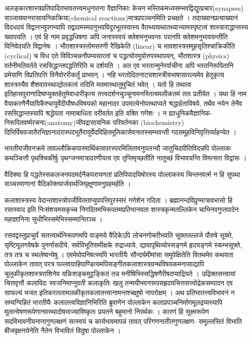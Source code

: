 {\dev अलङ्कारशास्त्रप्रतिपादितभावतत्त्वमधुनातना वैज्ञानिकाः केचन मस्तिकमध्यसम्भवद्विद्यु\break\-त्प्रचार}(synapses) {\dev सञ्जायमानरासायनिकक्रिया}(chemical reactions){\dev मात्रप्रपञ्चनमिति प्रचक्षते । तदाख्यानप्रत्याख्यानं विदधदयं विद्वानभ्युपगम्यापि तद्वादमस्मदनुभवविदूरभूत\break\-स्यास्य वैतथ्ययाथातथ्याभ्यामस्पृष्टत्वं शास्त्राराद्धा\-न्तस्य ख्यापयति । एवं हि नाम प्रवृद्धधिषणा अपि जनास्स्वयं क्लेशमनुभवन्तः परानपि क्लेशमनुभावयन्तीति विनिवेदयति विद्वानेषः । भौत\-शास्त्रस्तोमसरणी रैखिकेति} (linear) {\dev च भावशास्त्र\-समूहसृतिश्चाक्रिकीति} (cyclical) {\dev च विध एते विविञ्चन्ननौपम्यसारतां च पद्धत्योरमुयोरुपस्थापयन्, भौतशास्त्र} (physics) {\dev वर्तनीमति\-वर्तते रससिद्धान्तपद्धतिरिति च दर्शयति । अत एव भरतान्मुनेरर्वाचीना अपि भरतनिरूपितानि प्रमेयाणि विप्रतिपत्तिं विनैवोररीकर्तुं प्राभवन् । नहि भरतोदितनाट्य\-शास्त्रीयभाषासारल्यमेव हेतूकृत्य शास्त्रस्यैव शैशवावस्थाद्योतकत्वं तदिति मतमास्थातुमुचितं भवेत् । यतो हि तथात्व इतिहासपुराणादिष्वप्युक्तहेतुमेवाधारीकृत्य तत्त्वदर्शनचुञ्चूनामनस्ति\-त्वमलीकतमं ततः प्रती\break\-येत । यथा हि नाम वैयाकरणैर्नैयायिकैश्चायुर्वेदीयौषधविषयको महानादर उपमात्वेनोपस्था\break\-प्यते श्रद्धार्हताविषये, तथैव नयेन तेनैव रससिद्धान्तस्यापि श्रद्धेयता नामाबाधिता वरीवर्तत इति वक्ति गणॆशः । न ह्याधुनिकवैज्ञानिक- निरूपितवर्ष्मरचना}(anatomy){\dev जीवद्रासायनिक परिवर्तनका} (biochemistry) {\dev दिभिर्विषयजातैरभिज्ञानादरास्पदभूतैरायुर्वेदविहित\-मूलिका\break\-सेवनातस्सम्भवन्ती गदसमूहविनिवृत्तिर्व्याहन्येत ।}

{\dev भारतीयजीवनक्रमे तावल्लौकिकपारमार्थिकावपरस्परमिलितावनुपलभ्यौ जातुचिदपीति\break विदन्नपि पोल्लाकः कथञ्चित्तौ पृथक्चिकीर्षुः पृथग्जनमात्रादरणीयत्व एव तृप्तिमृच्छतीति नातुच्छं विभावयन्ति विमत्सरा विद्वांसः ।}

{\dev वैदिक्या हि पद्धतेस्सकलजनपदमर्दनैकपरायणतां प्रतिपिपादयिषोरस्य पोल्लाकस्य चिन्तनवर्त्म न हि सुपथा सञ्चरमाणानां वैदिकोक्त्यार्जवार्थजिघृक्षूणामनुग्रहमर्हति ।}

{\dev कलाशास्त्रस्य वेदान्तशास्त्रोपजीवितताप्युपपत्तिपुरस्सरं गणेशेन गदिता । ब्रह्मानन्दविप्रुण्मा\-त्रावभासो हि रसास्वाद इति निःसंशयमसकृच्च निगदितमभिरूपतमप्रतिभानवता शास्त्रकृन्मत\-ल्लिकेन चाभिनवगुप्तपादेन महाज्ञानिना सुधीभिस्समेभिस्सम्मानितञ्च ।}

{\dev रसवद्वस्तुप्राचुर्यं सतत्त्वार्थनिरूपणमपि वाङ्मये वैदिकेऽपि लोचनगोचरीभवति सूक्ततल्लजे पौरुषे सूक्ते, सृष्टिमूलगवेषके पुनर्नासदीये, सर्वविभूतिसमीक्षके रुद्राध्याये, द्यावापृथिव्योस्स\-ङ्गमे हृदयङ्गमे स्कम्भसूक्ते, तत्र तत्र च स्थलेष्वन्येषु । एवमेवोपनिषत्स्वपि भारतीयैः सौन्दर्य\-मीमांसा समुपेक्षितेति वितथमेव कथयता पोल्लाकेन तावत् परत्र पल्लवग्राहिपाण्डित्यमपि\break  सङ्गीतकलाशास्त्रग्रन्थविषयकमनासाद्यापि चुलुकीकृतशास्त्रराशिनेव यन्निःशङ्कमुट्टङ्कितं तन्न मनीषिभिस्सद्धिषणैरीषदप्याद्रियते । उद्रिक्तसत्त्वायां चित्तवृत्तौ कलाविदः स्वजनिमाप्नुवती कलाकृतिः खलु तन्मयीभवनरूपसहृदयचित्तसत्त्वोद्रेकसम्पादन एव साफल्यं भजत इति\break करतलामलकीकृतकलातत्त्वानामन्तश्चक्षुषो नापरोक्षम् । अथ प्रतिभातत्त्वविभावनं न सम्य\-ग्विहितं भारतीयैः कलातत्त्वविज्ञानिभिरिति ब्रुवाणेन पोल्लाकेन कलाप्रपञ्चनिर्माणमूलद्रव्य\-स्यापि मूलान्वेषणरूपेणानवस्थादोषभाज्याविष्कृतः प्रयतने बहुमानो निरर्थकः । कारणं हि सूक्ष्मरूपेण सदविभावनीयनानागुणलक्षणं सत्स्वयं च कार्यभावमापन्नं तावत् परिगणनातीत\-गुणलक्षण- समुल्लसितं विभाति बीजवृक्षनयेनेति नैतेन विभावितं विदुषा पोल्लाकेन ।}

